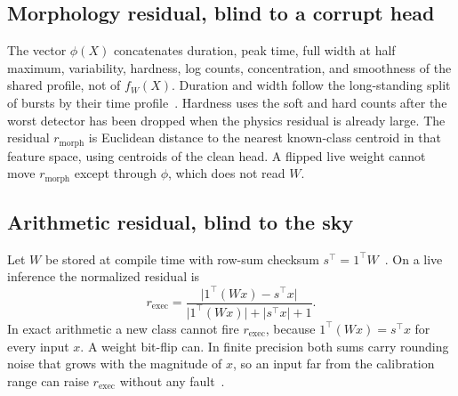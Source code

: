 \documentclass[preprint,12pt]{elsarticle}
\begin{document}
\subsection{Morphology residual, blind to a corrupt head}

The vector $\phi(X)$ concatenates duration, peak time, full width at half maximum, variability, hardness, log counts, concentration, and smoothness of the shared profile, not of $f_W(X)$. Duration and width follow the long-standing split of bursts by their time profile~\cite{kouveliotou1993}. Hardness uses the soft and hard counts after the worst detector has been dropped when the physics residual is already large. The residual $r_{\mathrm{morph}}$ is Euclidean distance to the nearest known-class centroid in that feature space, using centroids of the clean head. A flipped live weight cannot move $r_{\mathrm{morph}}$ except through $\phi$, which does not read $W$.

\subsection{Arithmetic residual, blind to the sky}

Let $W$ be stored at compile time with row-sum checksum $s^\top=1^\top W$~\cite{zhao2021,huang1984}. On a live inference the normalized residual is
\begin{equation}
r_{\mathrm{exec}}=\frac{\lvert 1^\top(Wx)-s^\top x\rvert}{\lvert 1^\top(Wx)\rvert+\lvert s^\top x\rvert+1}.
\label{eq:exec}
\end{equation}
In exact arithmetic a new class cannot fire $r_{\mathrm{exec}}$, because $1^\top(Wx)=s^\top x$ for every input $x$. A weight bit-flip can. In finite precision both sums carry rounding noise that grows with the magnitude of $x$, so an input far from the calibration range can raise $r_{\mathrm{exec}}$ without any fault~\cite{higham2002}.
\end{document}
